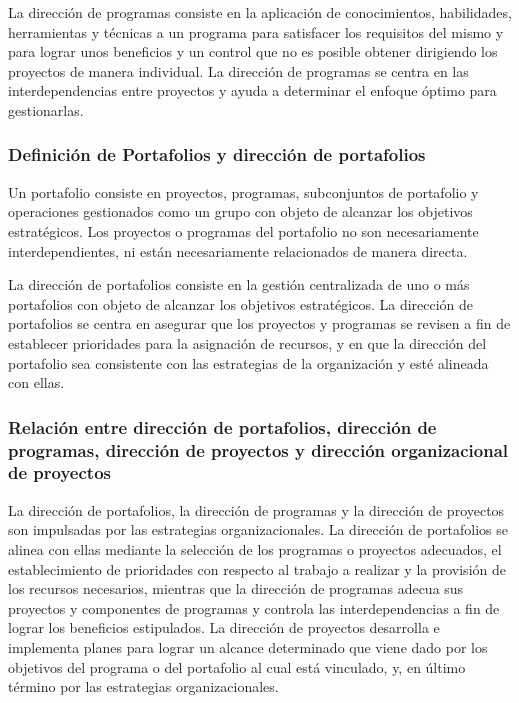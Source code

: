 La dirección de programas consiste en la aplicación de conocimientos, habilidades, herramientas y técnicas a un programa para satisfacer los requisitos del mismo y para lograr unos beneficios y un control que no es posible obtener dirigiendo los proyectos de manera individual. La dirección de programas se centra en las interdependencias entre proyectos y ayuda a determinar el enfoque óptimo para gestionarlas.

\subsubsection{Definición de Portafolios y dirección de portafolios}

Un portafolio consiste en proyectos, programas, subconjuntos de portafolio y operaciones gestionados como un grupo con objeto de alcanzar los objetivos estratégicos. Los proyectos o programas del portafolio no son necesariamente interdependientes, ni están necesariamente relacionados de manera directa.

La dirección de portafolios consiste en la gestión centralizada de uno o más portafolios con objeto de alcanzar los objetivos estratégicos. La dirección de portafolios se centra en asegurar que los proyectos y programas se revisen a fin de establecer prioridades para la asignación de recursos, y en que la dirección del portafolio sea consistente con las estrategias de la organización y esté alineada con ellas.

\subsubsection{Relación entre dirección de portafolios, dirección de programas, dirección de proyectos y dirección organizacional de proyectos}

La dirección de portafolios, la dirección de programas y la dirección de proyectos son impulsadas por las estrategias organizacionales. La dirección de portafolios se alinea con ellas mediante la selección de los programas o proyectos adecuados, el establecimiento de prioridades con respecto al trabajo a realizar y la provisión de los recursos necesarios, mientras que la dirección de programas adecua sus proyectos y componentes de programas y controla las interdependencias a fin de lograr los beneficios estipulados. La dirección de proyectos desarrolla e implementa planes para lograr un alcance determinado que viene dado por los objetivos del programa o del portafolio al cual está vinculado, y, en último término por las estrategias organizacionales.

